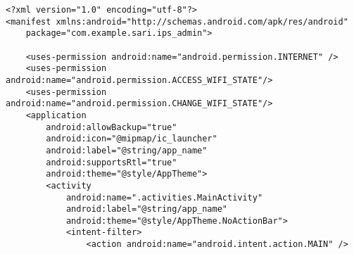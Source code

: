 \begin{lstlisting}<?xml version="1.0" encoding="utf-8"?>
<manifest xmlns:android="http://schemas.android.com/apk/res/android"
    package="com.example.sari.ips_admin">

    <uses-permission android:name="android.permission.INTERNET" />
    <uses-permission android:name="android.permission.ACCESS_WIFI_STATE"/>
    <uses-permission android:name="android.permission.CHANGE_WIFI_STATE"/>
    <application
        android:allowBackup="true"
        android:icon="@mipmap/ic_launcher"
        android:label="@string/app_name"
        android:supportsRtl="true"
        android:theme="@style/AppTheme">
        <activity
            android:name=".activities.MainActivity"
            android:label="@string/app_name"
            android:theme="@style/AppTheme.NoActionBar">
            <intent-filter>
                <action android:name="android.intent.action.MAIN" />


\end{lstlisting}
